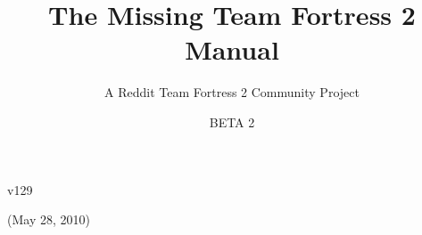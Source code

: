 \documentclass[letterpaper,12pt]{article}
\title{The Missing Team Fortress 2 Manual}
\author{A Reddit Team Fortress 2 Community Project}
\date{BETA 2}
\begin{document}
\maketitle

\vspace{145 mm}
\begin{center}v129 \end{center}

\begin{center}(May 28, 2010) \end{center}



\thispagestyle{empty}
\newpage
\pagestyle{headings}
\setcounter{page}{1}

\tableofcontents


\newpage
\setcounter{page}{1}



\newpage



\newpage


\newpage


\newpage


\newpage


\newpage


\newpage

\end{document}
